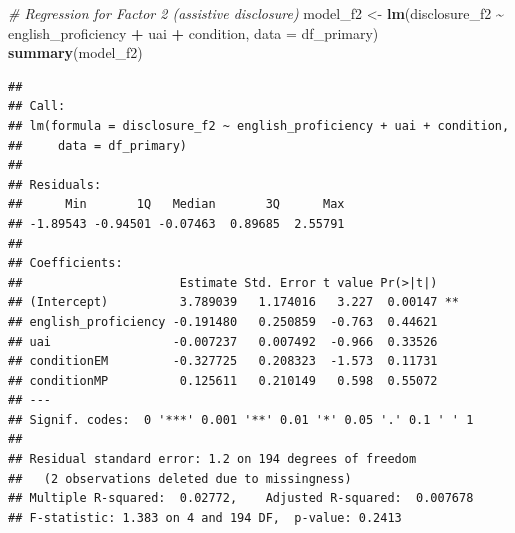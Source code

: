 \documentclass[
]{article}
\newenvironment{Shaded}{\begin{snugshade}}{\end{snugshade}}
\newcommand{\AttributeTok}[1]{\textcolor[rgb]{0.13,0.29,0.53}{#1}}
\newcommand{\CommentTok}[1]{\textcolor[rgb]{0.56,0.35,0.01}{\textit{#1}}}
\newcommand{\FunctionTok}[1]{\textcolor[rgb]{0.13,0.29,0.53}{\textbf{#1}}}
\newcommand{\NormalTok}[1]{#1}
\newcommand{\OtherTok}[1]{\textcolor[rgb]{0.56,0.35,0.01}{#1}}
\newcommand{\SpecialCharTok}[1]{\textcolor[rgb]{0.81,0.36,0.00}{\textbf{#1}}}
\begin{document}
\begin{Shaded}
\begin{Highlighting}[]
\CommentTok{\# Regression for Factor 2 (assistive disclosure)}
\NormalTok{model\_f2 }\OtherTok{\textless{}{-}} \FunctionTok{lm}\NormalTok{(disclosure\_f2 }\SpecialCharTok{\textasciitilde{}}\NormalTok{ english\_proficiency }\SpecialCharTok{+}\NormalTok{ uai }\SpecialCharTok{+}\NormalTok{ condition,}
               \AttributeTok{data =}\NormalTok{ df\_primary)}
\FunctionTok{summary}\NormalTok{(model\_f2)}
\end{Highlighting}
\end{Shaded}

\begin{verbatim}
## 
## Call:
## lm(formula = disclosure_f2 ~ english_proficiency + uai + condition, 
##     data = df_primary)
## 
## Residuals:
##      Min       1Q   Median       3Q      Max 
## -1.89543 -0.94501 -0.07463  0.89685  2.55791 
## 
## Coefficients:
##                      Estimate Std. Error t value Pr(>|t|)   
## (Intercept)          3.789039   1.174016   3.227  0.00147 **
## english_proficiency -0.191480   0.250859  -0.763  0.44621   
## uai                 -0.007237   0.007492  -0.966  0.33526   
## conditionEM         -0.327725   0.208323  -1.573  0.11731   
## conditionMP          0.125611   0.210149   0.598  0.55072   
## ---
## Signif. codes:  0 '***' 0.001 '**' 0.01 '*' 0.05 '.' 0.1 ' ' 1
## 
## Residual standard error: 1.2 on 194 degrees of freedom
##   (2 observations deleted due to missingness)
## Multiple R-squared:  0.02772,    Adjusted R-squared:  0.007678 
## F-statistic: 1.383 on 4 and 194 DF,  p-value: 0.2413
\end{verbatim}

\begin{Shaded}
\end{Shaded}
\end{document}
